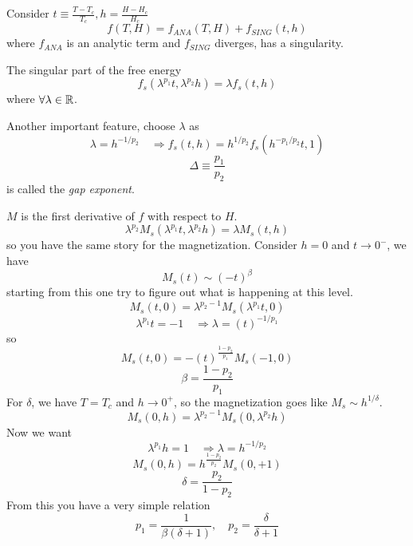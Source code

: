 \documentclass[../main/main.tex]{subfiles}
\begin{document}
Consider \( t \equiv  \frac{T - T_c}{T_c}, h = \frac{H - H_c}{H_c} \)
\begin{equation}
  f (T,H) = f_{ANA} (T,H) + f_{SING} (t,h)
\end{equation}
where \( f_{ANA} \) is an analytic term and \( f_{SING} \) diverges, has a singularity.

The singular part of the free energy
\begin{equation}
  f_s ( \lambda ^{p_1} t, \lambda ^{p_2} h) = \lambda f_s (t,h)
\end{equation}
where \( \forall \lambda \in \mathbb{R} \).

Another important feature, choose \( \lambda  \) as
\begin{equation}
  \lambda = h^{-1/p_2} \quad \Rightarrow f_s (t,h) = h^{1/p_2} f_s (h^{-p_1/p_2} t , 1)
\end{equation}
\begin{equation}
  \Delta  \equiv \frac{p_1}{p_2}
\end{equation}
is called the \emph{gap exponent}.

\( M \) is the first derivative of \( f \) with respect to \( H \).
\begin{equation}
  \lambda ^{p_2} M_s ( \lambda ^{p_1} t, \lambda ^{p_2} h) = \lambda M_s (t,h)
\end{equation}
so you have the same story for the magnetization.
Consider \( h=0 \) and \( t \rightarrow 0^- \), we have
\begin{equation}
  M_s (t) \sim (-t)^{\beta }
\end{equation}
starting from this one try to figure out what is happening at this level.
\begin{equation}
  M_s (t,0) = \lambda ^{p_2 -1} M_s ( \lambda ^{p_1} t,0)
\end{equation}
\begin{equation}
  \lambda ^{p_1} t = -1 \quad \Rightarrow \lambda = (t)^{-1/p_1}
\end{equation}
so
\begin{equation}
  M_s (t,0) = - (t)^{\frac{1-p_2}{p_1}} M_s (-1,0)
\end{equation}
\begin{equation}
  \beta = \frac{1-p_2}{p_1}
\end{equation}
For \( \delta  \), we have  \( T=T_c \) and \( h \rightarrow 0^+ \), so the magnetization goes like \( M_s \sim h^{1/\delta } \).
\begin{equation}
  M_s (0,h) = \lambda ^{p_2 - 1} M_s (0,\lambda ^{p_2} h)
\end{equation}
Now we want
\begin{equation}
  \lambda ^{p_1} h = 1 \quad \Rightarrow \lambda = h ^{-1/p_2}
\end{equation}
\begin{equation}
  M_s (0,h) = h ^{\frac{1-p_2}{p_2}} M_s (0,+1)
\end{equation}
\begin{equation}
  \delta = \frac{p_2}{ 1 - p_2 }
\end{equation}
From this you have a very simple relation
\begin{equation}
  p_1 = \frac{1}{\beta (\delta +1)}, \quad p_2 = \frac{\delta }{\delta + 1}
\end{equation}
\end{document}
